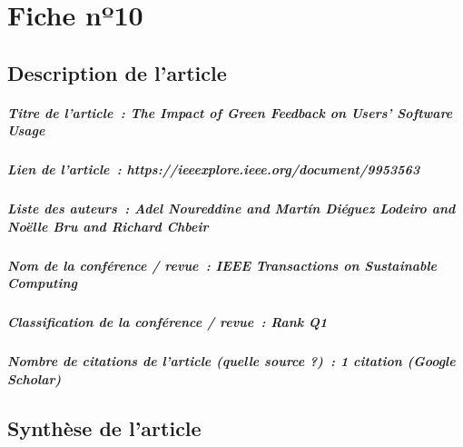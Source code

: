 
\chapter{Fiche nº10} %
\label{app:Fiche10} %

\section{Description de l'article}

\paragraph{Titre de l'article~: \textnormal{The Impact of Green Feedback on Users’ Software Usage}}
\paragraph{Lien de l'article~: \textnormal{https://ieeexplore.ieee.org/document/9953563}}
\paragraph{Liste des auteurs~: \textnormal{Adel Noureddine and Martín Diéguez Lodeiro and Noëlle Bru and Richard Chbeir}}
\paragraph{Nom de la conférence / revue~: \textnormal{IEEE Transactions on Sustainable Computing}}
\paragraph{Classification de la conférence / revue~: \textnormal{Rank Q1}}
\paragraph{Nombre de citations de l'article (quelle source ?)~: \textnormal{1 citation (Google Scholar)}}



\section{Synthèse de l'article}

